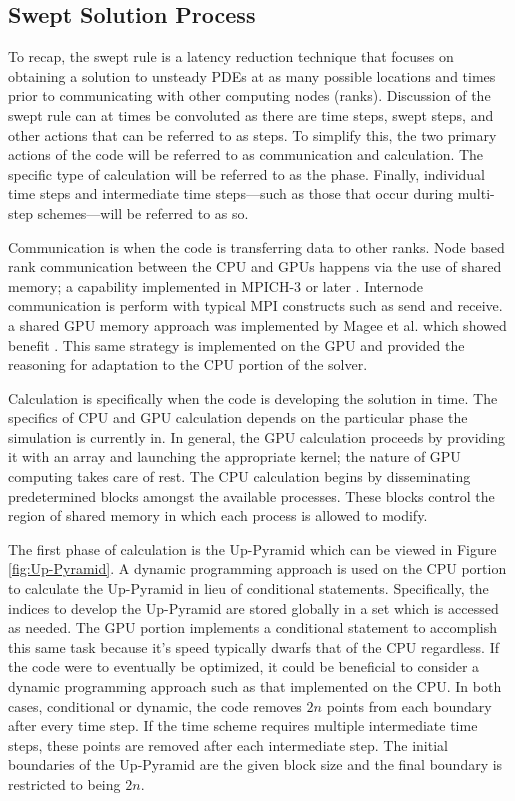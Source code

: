 \documentclass[review]{elsarticle}
\begin{document}
\subsection{Swept Solution Process}
\par
To recap, the swept rule is a latency reduction technique that focuses on obtaining a solution to unsteady PDEs at as many possible locations and times prior to communicating with other computing nodes (ranks). Discussion of the swept rule can at times be convoluted as there are time steps, swept steps, and other actions that can be referred to as steps. To simplify this, the two primary actions of the code will be referred to as communication and calculation. The specific type of calculation will be referred to as the phase. Finally, individual time steps and intermediate time steps---such as those that occur during multi-step schemes---will be referred to as so. 

\par
 Communication is when the code is transferring data to other ranks. Node based rank communication between the CPU and GPUs happens via the use of shared memory; a capability implemented in MPICH-3 or later \cite{Hoefler2013MPIMemory}. Internode communication is perform with typical MPI constructs such as send and receive. a shared GPU memory approach was implemented by Magee et al. which showed benefit \cite{Magee2018AcceleratingDecomposition}. This same strategy is implemented on the GPU and provided the reasoning for adaptation to the CPU portion of the solver. 
 
 \par
 Calculation is specifically when the code is developing the solution in time. The specifics of CPU and GPU calculation depends on the particular phase the simulation is currently in. In general, the GPU calculation proceeds by providing it with an array and launching the appropriate kernel; the nature of GPU computing takes care of rest. The CPU calculation begins by disseminating predetermined blocks amongst the available processes. These blocks control the region of shared memory in which each process is allowed to modify.
 
\par
The first phase of calculation is the Up-Pyramid which can be viewed in Figure \ref{fig:Up-Pyramid}. A dynamic programming approach is used on the CPU portion to calculate the Up-Pyramid in lieu of conditional statements. Specifically, the indices to develop the Up-Pyramid are stored globally in a set which is accessed as needed. The GPU portion implements a conditional statement to accomplish this same task because it's speed typically dwarfs that of the CPU regardless. If the code were to eventually be optimized, it could be beneficial to consider a dynamic programming approach such as that implemented on the CPU. In both cases, conditional or dynamic, the code removes $2n$ points from each boundary after every time step. If the time scheme requires multiple intermediate time steps, these points are removed after each intermediate step. The initial boundaries of the Up-Pyramid are the given block size and the final boundary is restricted to being $2n$.
\end{document}
